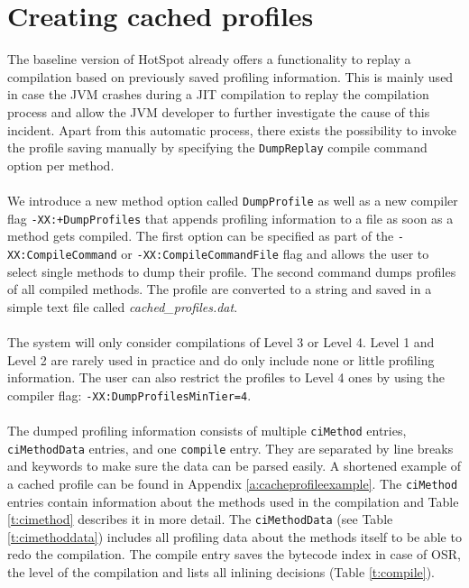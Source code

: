 \section{Creating cached profiles}
\label{s:creatingprofiles}
The baseline version of HotSpot already offers a functionality to replay a compilation based on previously saved profiling information.
This is mainly used in case the JVM crashes during a JIT compilation to replay the compilation process and allow the JVM developer to further investigate the cause of this incident.
Apart from this automatic process, there exists the possibility to invoke the profile saving manually by specifying the \texttt{DumpReplay} compile command option per method.
\\\\
We introduce a new method option called \texttt{DumpProfile} as well as a new compiler flag \newline\texttt{-XX:+DumpProfiles} that appends profiling information to a file as soon as a method gets compiled. The first option can be specified as part of the \texttt{-XX:CompileCommand} or \texttt{-XX:CompileCommandFile} flag and allows the user to select single methods to dump their profile. The second command dumps profiles of all compiled methods.
The profile are converted to a string and saved in a simple text file called \textit{cached\_profiles.dat}.
\\\\
The system will only consider compilations of Level 3 or Level 4. Level 1 and Level 2 are rarely used in practice and do only include none or little profiling information. The user can also restrict the profiles to Level 4 ones by using the compiler flag: \texttt{-XX:DumpProfilesMinTier=4}.
\\\\
The dumped profiling information consists of multiple \texttt{ciMethod} entries, \texttt{ciMethodData} entries, and one \texttt{compile} entry. They are separated by line breaks and keywords to make sure the data can be parsed easily. A shortened example of a cached profile can be found in Appendix \ref{a:cacheprofileexample}. The \texttt{ciMethod} entries contain information about the methods used in the compilation and Table \ref{t:cimethod} describes it in more detail. The \texttt{ciMethodData} (see Table \ref{t:cimethoddata}) includes all profiling data about the methods itself to be able to redo the compilation.
The compile entry saves the bytecode index in case of OSR, the level of the compilation and lists all inlining decisions (Table \ref{t:compile}).
